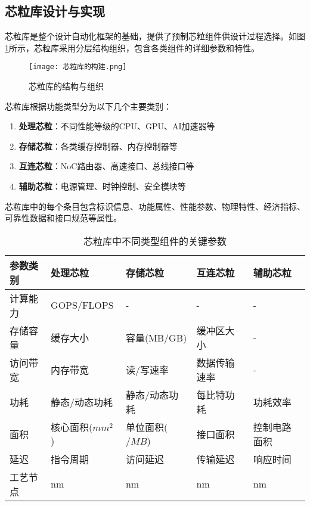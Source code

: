 \documentclass[bachelor]{thesis-uestc}
\begin{document}
\subsection{芯粒库设计与实现}

芯粒库是整个设计自动化框架的基础，提供了预制芯粒组件供设计过程选择。如图\ref{fig:chiplet_lib}所示，芯粒库采用分层结构组织，包含各类组件的详细参数和特性。

\begin{figure}[htbp]
    \centering
    \texttt{[image: 芯粒库的构建.png]}
    \caption{芯粒库的结构与组织}
    \label{fig:chiplet_lib}
\end{figure}

芯粒库根据功能类型分为以下几个主要类别：

\begin{enumerate}
    \item \textbf{处理芯粒}：不同性能等级的CPU、GPU、AI加速器等
    \item \textbf{存储芯粒}：各类缓存控制器、内存控制器等
    \item \textbf{互连芯粒}：NoC路由器、高速接口、总线接口等
    \item \textbf{辅助芯粒}：电源管理、时钟控制、安全模块等
\end{enumerate}

芯粒库中的每个条目包含标识信息、功能属性、性能参数、物理特性、经济指标、可靠性数据和接口规范等属性。

\begin{table}[htbp]
\caption{芯粒库中不同类型组件的关键参数}
\centering
\begin{tabular}{|p{2.5cm}|p{2.5cm}|p{2.5cm}|p{2.5cm}|p{2.5cm}|}
\hline
\textbf{参数类别} & \textbf{处理芯粒} & \textbf{存储芯粒} & \textbf{互连芯粒} & \textbf{辅助芯粒} \\
\hline
计算能力 & GOPS/FLOPS & - & - & - \\
\hline
存储容量 & 缓存大小 & 容量(MB/GB) & 缓冲区大小 & - \\
\hline
访问带宽 & 内存带宽 & 读/写速率 & 数据传输速率 & - \\
\hline
功耗 & 静态/动态功耗 & 静态/动态功耗 & 每比特功耗 & 功耗效率 \\
\hline
面积 & 核心面积($mm^2$) & 单位面积($/MB$) & 接口面积 & 控制电路面积 \\
\hline
延迟 & 指令周期 & 访问延迟 & 传输延迟 & 响应时间 \\
\hline
工艺节点 & nm & nm & nm & nm \\
\hline
\end{tabular}
\label{tab:chiplet_params}
\end{table}
\end{document}
